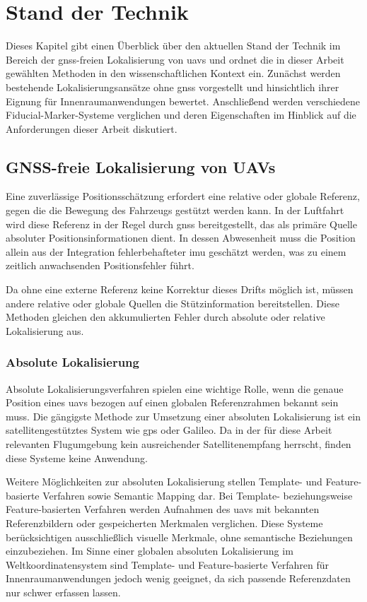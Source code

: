 
\chapter{Stand der Technik}
\label{cap:stand_der_technik}

Dieses Kapitel gibt einen Überblick über den aktuellen Stand der Technik im Bereich 
der \gls{gnss}-freien Lokalisierung von \gls{uav}s und ordnet die in dieser Arbeit 
gewählten Methoden in den wissenschaftlichen Kontext ein.
Zunächst werden bestehende Lokalisierungsansätze ohne \gls{gnss} vorgestellt und hinsichtlich ihrer Eignung für Innenraumanwendungen bewertet.
Anschließend werden verschiedene Fiducial-Marker-Systeme verglichen und deren Eigenschaften im Hinblick auf die Anforderungen dieser Arbeit diskutiert.


\section{GNSS-freie Lokalisierung von UAVs}
Eine zuverlässige Positionsschätzung erfordert eine relative oder globale Referenz, gegen die die Bewegung des Fahrzeugs gestützt werden kann.
In der Luftfahrt wird diese Referenz in der Regel durch \gls{gnss} bereitgestellt, das als primäre Quelle absoluter Positionsinformationen dient.
In dessen Abwesenheit muss die Position allein aus der Integration fehlerbehafteter \gls{imu} geschätzt werden, was zu einem zeitlich anwachsenden Positionsfehler führt.

Da ohne eine externe Referenz keine Korrektur dieses Drifts möglich ist, müssen andere relative oder globale Quellen die Stützinformation bereitstellen.
Diese Methoden gleichen den akkumulierten Fehler durch absolute oder relative Lokalisierung aus.~\cite{Jarraya2025}

\subsection{Absolute Lokalisierung}
Absolute Lokalisierungsverfahren spielen eine wichtige Rolle, wenn die genaue Position eines \gls{uav}s bezogen auf einen globalen Referenzrahmen bekannt sein muss.
Die gängigste Methode zur Umsetzung einer absoluten Lokalisierung ist ein satellitengestütztes System wie \gls{gps} oder Galileo.
Da in der für diese Arbeit relevanten Flugumgebung kein ausreichender Satellitenempfang herrscht, finden diese Systeme keine Anwendung.~\cite{Jarraya2025}

Weitere Möglichkeiten zur absoluten Lokalisierung stellen Template- und Feature-basierte Verfahren sowie Semantic Mapping dar.
Bei Template- beziehungsweise Feature-basierten Verfahren werden Aufnahmen des \gls{uav}s mit bekannten Referenzbildern oder gespeicherten Merkmalen verglichen.
Diese Systeme berücksichtigen ausschließlich visuelle Merkmale, ohne semantische Beziehungen einzubeziehen.
Im Sinne einer globalen absoluten Lokalisierung im Weltkoordinatensystem sind Template- und Feature-basierte Verfahren für Innenraumanwendungen jedoch wenig geeignet, 
da sich passende Referenzdaten nur schwer erfassen lassen.~\cite{Jarraya2025}

